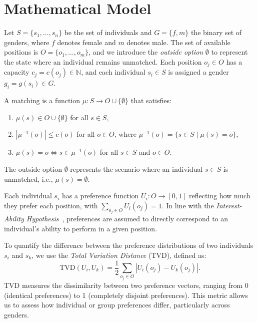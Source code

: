 \documentclass[letterpaper]{article}
\begin{document}
\section{Mathematical Model}

Let \( S = \{s_1, \ldots, s_n\} \) be the set of individuals and \( G = \{f, m\} \) the binary set of genders, where \( f \) denotes female and \( m \) denotes male. The set of available positions is \( O = \{o_1, \ldots, o_m\} \), and we introduce the \textit{outside option} \( \emptyset \) to represent the state where an individual remains unmatched. Each position \( o_j \in O \) has a capacity \( c_j = c(o_j) \in \mathbb{N} \), and each individual \( s_i \in S \) is assigned a gender \( g_i = g(s_i) \in G \).

A matching is a function \( \mu : S \to O \cup \{\emptyset\} \) that satisfies:
\begin{enumerate}
    \item \( \mu(s) \in O \cup \{\emptyset\} \) for all \( s \in S \),
    \item  \( |\mu^{-1}(o)| \leq c(o) \) for all \( o \in O \), where \( \mu^{-1}(o) = \{ s \in S \mid \mu(s) = o \} \),
    \item \( \mu(s) = o \iff s \in \mu^{-1}(o) \) for all \( s \in S \) and \( o \in O \).
\end{enumerate}

The outside option \( \emptyset \) represents the scenario where an individual \( s \in S \) is unmatched, i.e., \( \mu(s) = \emptyset \).

Each individual \( s_i \) has a preference function \( U_i : O \to [0, 1] \) reflecting how much they prefer each position, with \( \sum_{o_j \in O} U_i(o_j) = 1 \). In line with the \textit{Interest-Ability Hypothesis}~\cite{jintelligence10030043}, preferences are assumed to directly correspond to an individual's ability to perform in a given position.

To quantify the difference between the preference distributions of two individuals \( s_i \) and \( s_k \), we use the \textit{Total Variation Distance} (TVD), defined as:
\begin{equation}
\text{TVD}(U_i, U_k) = \frac{1}{2} \sum_{o_j \in O} \left| U_i(o_j) - U_k(o_j) \right|.
\end{equation}
TVD measures the dissimilarity between two preference vectors, ranging from 0 (identical preferences) to 1 (completely disjoint preferences). This metric allows us to assess how individual or group preferences differ, particularly across genders.
\end{document}
